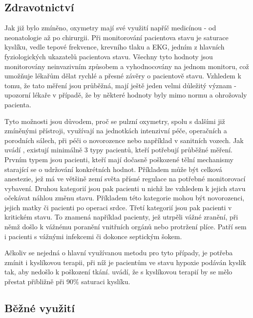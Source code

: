 \subsection {Zdravotnictví}
Jak již bylo zmíněno, oxymetry mají své využití napříč medicínou - od neonatologie až po chirurgii. Při monitorování pacientova stavu je saturace kyslíku, vedle tepové frekvence, krevního tlaku a EKG, jedním z hlavních fyziologických ukazatelů pacientova stavu. Všechny tyto hodnoty jsou monitorovány neinvazivním způsobem a vyhodnocovány na jednom monitoru, což umožňuje lékařům  dělat rychlé a přesné závěry o pacientově stavu. Vzhledem k tomu, že tato měření jsou průběžná, mají ještě jeden velmi důležitý význam - upozorní lékaře v případě, že by některé hodnoty byly mimo normu a ohrožovaly pacienta.
\par Tyto možnosti jsou důvodem, proč se pulzní oxymetry, spolu s dalšími již zmíněnými přístroji, využívají na jednotkách intenzivní péče, operačních a porodních sálech, při péči o novorozence nebo například v sanitních vozech. Jak uvádí \cite{monitoring}, existují minimálně 3 typy pacientů, kteří potřebují průběžné měření. Prvním typem jsou pacienti, kteří mají dočasně poškozené tělní mechanismy starající se o udržování konkrétních hodnot. Příkladem může být celková anestezie, jež má ve většině zemí světa přísné regulace na potřebné monitorovací vybavení. Druhou kategorií jsou pak pacienti u nichž lze vzhledem k jejich stavu očekávat náhlou změnu stavu. Příkladem této kategorie mohou být novorozenci, jejich matky či pacienti po operaci srdce. Třetí kategorií jsou pak pacienti v kritickém stavu. To znamená například pacienty, jež utrpěli vážné zranění, při němž došlo k vážnému poranění vnitřních orgánů nebo protržení plíce. Patří sem i pacienti s vážnými infekcemi či dokonce septickým šokem.
\par Ačkoliv se nejedná o hlavní využívanou metodu pro tyto případy, je potřeba zmínit i kyslíkovou terapii, při níž je pacientům ve stavu hypoxie podáván kyslík tak, aby nedošlo k poškození tkání. \cite{O2terapie} uvádí, že s kyslíkovou terapií by se mělo přestat přibližně při 90\% saturaci kyslíku.
\subsection {Běžné využití}